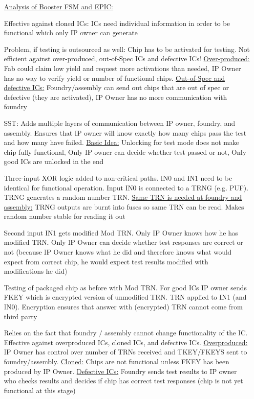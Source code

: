 \documentclass[landscape, a4paper]{article}
\begin{document}
\begin{minipage}[t]{0.2\linewidth}
\begin{betterlist}
\begin{betterlist}
			\item \underline{Analysis of Booster FSM and EPIC:}
			\begin{betterlist}
				\item \alert{Effective against cloned ICs:} ICs need individual information in order to be functional which only IP owner can generate
				\item \alert{Problem, if testing is outsourced as well:} Chip has to be activated for testing. Not efficient against over-produced, out-of-Spec ICs and defective ICs! \underline{Over-produced:} Fab could claim low yield and request more activations than needed, IP Owner has no way to verify yield or number of functional chips. \underline{Out-of-Spec and defective ICs:} Foundry/assembly can send out chips that are out of spec or defective (they are activated), IP Owner has no more communication with foundry
			\end{betterlist}
			\item \alert{SST:} Adds multiple layers of communication between IP owner, foundry, and assembly. Ensures that IP owner will know exactly how many chips pass the test and how many have failed. \underline{Basic Idea:} Unlocking for test mode does not make chip fully functional, Only IP owner can decide whether test passed or not, Only good ICs are unlocked in the end
			\begin{betterlist}
				\item Three-input XOR logic added to non-critical paths. IN0 and IN1 need to be identical for functional operation. Input IN0 is connected to a TRNG (e.g. PUF). TRNG generates a random number TRN. \underline{Same TRN is needed at foundry and assembly:} TRNG outputs are burnt into fuses so same TRN can be read. Makes random number stable for reading it out
				\item Second input IN1 gets modified Mod TRN. Only IP Owner knows how he has modified TRN. Only IP Owner can decide whether test responses are correct or not (because IP Owner knows what he did and therefore knows what would expect from correct chip, he would expect test results modified with modifications he did)
				\item Testing of packaged chip as before with Mod TRN. For good ICs IP owner sends FKEY which is encrypted version of unmodified TRN. TRN applied to IN1 (and IN0). Encryption ensures that answer with (encrypted) TRN cannot come from third party
				\item Relies on the fact that foundry / assembly cannot change functionality of the IC. Effective against overproduced ICs, cloned ICs, and defective ICs. \underline{Overproduced:} IP Owner has control over number of TRNs received and TKEY/FKEYS sent to foundry/assembly. \underline{Cloned:} Chips are not functional unless FKEY has been produced by IP Owner. \underline{Defective ICs:} Foundry sends test results to IP owner who checks results and decides if chip has correct test responses (chip is not yet functional at this stage)

\end{betterlist}
\end{betterlist}
\end{betterlist}
\end{minipage}
\end{document}
